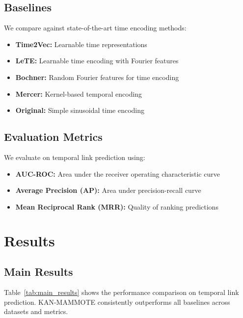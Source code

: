 \documentclass[conference]{IEEEtran}
\begin{document}
\subsection{Baselines}

We compare against state-of-the-art time encoding methods:
\begin{itemize}
\item \textbf{Time2Vec:} Learnable time representations \cite{kazemi2019time2vec}
\item \textbf{LeTE:} Learnable time encoding with Fourier features \cite{lete2023}
\item \textbf{Bochner:} Random Fourier features for time encoding
\item \textbf{Mercer:} Kernel-based temporal encoding
\item \textbf{Original:} Simple sinusoidal time encoding
\end{itemize}

\subsection{Evaluation Metrics}

We evaluate on temporal link prediction using:
\begin{itemize}
\item \textbf{AUC-ROC:} Area under the receiver operating characteristic curve
\item \textbf{Average Precision (AP):} Area under precision-recall curve
\item \textbf{Mean Reciprocal Rank (MRR):} Quality of ranking predictions
\end{itemize}

\section{Results}

\subsection{Main Results}

Table~\ref{tab:main_results} shows the performance comparison on temporal link prediction. KAN-MAMMOTE consistently outperforms all baselines across datasets and metrics.
\end{document}
